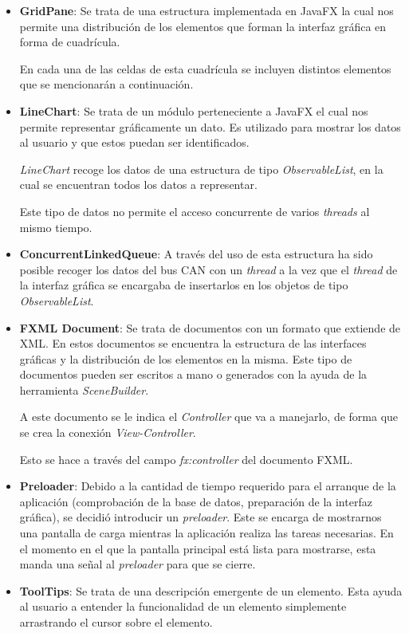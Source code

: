 \begin{itemize}
\item
\textbf{GridPane}: Se trata de una estructura implementada en JavaFX la cual nos permite una distribución de los elementos que forman la interfaz gráfica en forma de cuadrícula.

En cada una de las celdas de esta cuadrícula se incluyen distintos elementos que se mencionarán a continuación.
\item
\textbf{LineChart}: Se trata de un módulo perteneciente a JavaFX el cual nos permite representar gráficamente un dato. Es utilizado para mostrar los datos al usuario y que estos puedan ser identificados.

\emph{LineChart} recoge los datos de una estructura de tipo \emph{ObservableList}, en la cual se encuentran todos los datos a representar.

Este tipo de datos no permite el acceso concurrente de varios \emph{threads} al mismo tiempo.


\item
\textbf{ConcurrentLinkedQueue}: A través del uso de esta estructura ha sido posible recoger los datos del bus CAN con un \emph{thread} a la vez que el \emph{thread} de la interfaz gráfica se encargaba de insertarlos en los objetos de tipo \emph{ObservableList}.
\item
\textbf{FXML Document}: Se trata de documentos con un formato que extiende de XML. En estos documentos se encuentra la estructura de las interfaces gráficas y la distribución de los elementos en la misma. Este tipo de documentos pueden ser escritos a mano o generados con la ayuda de la herramienta \emph{SceneBuilder}.

A este documento se le indica el \emph{Controller} que va a manejarlo, de forma que se crea la conexión \emph{View-Controller}.

Esto se hace a través del campo \emph{fx:controller} del documento FXML.
\item
\textbf{Preloader}: Debido a la cantidad de tiempo requerido para el arranque de la aplicación (comprobación de la base de datos, preparación de la interfaz gráfica), se decidió introducir un \emph{preloader}. Este se encarga de mostrarnos una pantalla de carga mientras la aplicación realiza las tareas necesarias. En el momento en el que la pantalla principal está lista para mostrarse, esta manda una señal al \emph{preloader} para que se cierre.

\item
\textbf{ToolTips}: Se trata de una descripción emergente de un elemento. Esta ayuda al usuario a entender la funcionalidad de un elemento simplemente arrastrando el cursor sobre el elemento.


\end{itemize}


